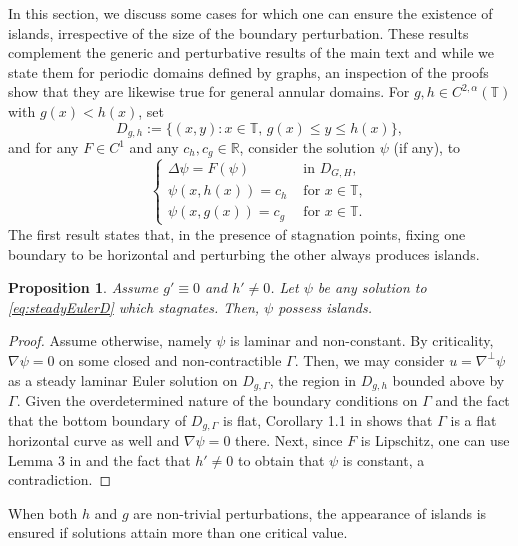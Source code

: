 \documentclass[11pt,reqno]{amsproc}
\newtheorem{proposition}{Proposition}[section]
\newcommand{\R}{\mathbb{R}}
\numberwithin{equation}{section}
\numberwithin{theorem}{section}
\numberwithin{prop}{section}
\numberwithin{cor}{section}
\numberwithin{lemma}{section}
\theoremstyle{remark}
\theoremstyle{definition}
\begin{document}
In this section, we discuss some cases for which one can ensure the existence of islands, irrespective of the size of the boundary perturbation. These results complement the generic and perturbative results of the main text and while we state them for periodic domains defined by graphs, an inspection of the proofs show that they are likewise true for general annular domains. For $g,h\in C^{2,\alpha}(\mathbb{T})$ with $g(x) < h(x)$, set
\begin{equation}
D_{g,h} := \lbrace (x,y): x\in \mathbb{T}, \, g(x) \leq y \leq h(x) \rbrace,
\end{equation}
and for any $F\in C^1$ and any $c_h,c_g\in \R$, consider the solution $\psi$ (if any), to
\begin{equation}\label{eq:steadyEulerD}
\begin{cases}
\Delta\psi = F(\psi) & \text{ in } D_{G,H}, \\
\psi(x, h(x))=c_h & \text{ for } x\in\mathbb{T}, \\
\psi(x,g(x))=c_g & \text{ for } x\in\mathbb{T}.
\end{cases}
\end{equation}
The first result states that, in the presence of stagnation points, fixing one boundary to be horizontal and perturbing the other always produces islands. 

\begin{proposition}\label{prop:ctnbottombdry}
Assume $g'\equiv 0$ and $h'\neq 0$. Let $\psi$ be any solution to \eqref{eq:steadyEulerD} which stagnates. Then, $\psi$ possess islands.
\end{proposition}

\begin{proof}
Assume otherwise, namely $\psi$ is laminar and non-constant.  By criticality, $\nabla\psi=0$ on some closed and non-contractible $\Gamma$. Then, we may consider $u=\nabla^\perp\psi$ as a steady laminar Euler solution on $D_{g,\Gamma}$, the region in $D_{g,h}$ bounded above by $\Gamma$. Given the overdetermined nature of the boundary conditions on $\Gamma$ and the fact that the bottom boundary of $D_{g,\Gamma}$ is flat, Corollary 1.1 in \cite{drivas2024geometric} shows that $\Gamma$ is a flat horizontal curve as well and $\nabla\psi=0$ there. Next, since $F$ is Lipschitz, one can use Lemma 3 in \cite{drivas2024islands} and the fact that $h'\neq 0$ to obtain that $\psi$ is constant, a contradiction.
\end{proof}

When both $h$ and $g$ are non-trivial perturbations, the appearance of islands is ensured if solutions attain more than one critical value.
\end{document}
